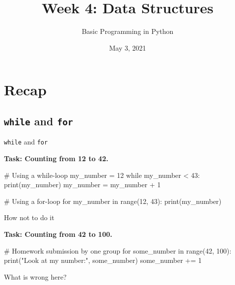 



\title[Data Structures]{Week 4: Data Structures}
\subtitle{Basic Programming in Python}


\date{May 3, 2021}

\begin{frame}[plain]
    \titlepage
\end{frame}

\begin{frame}
    \tableofcontents
\end{frame}


\section{Recap}

\subsection{\texttt{while} and \texttt{for}}

\begin{frame}[fragile]{\texttt{while} and \texttt{for}}

    \textbf{Task: Counting from 12 to 42.}

    \begin{pythoncode}
# Using a while-loop
my_number = 12
while my_number < 43:
    print(my_number)
    my_number = my_number + 1

# Using a for-loop
for my_number in range(12, 43):
    print(my_number)

    \end{pythoncode}

\end{frame}

\begin{frame}[fragile]{How not to do it}

    \textbf{Task: Counting from 42 to 100.}

    \begin{pythoncode}
# Homework submission by one group
for some_number in range(42, 100):
    print("Look at my number:", some_number)
    some_number += 1

    \end{pythoncode}

    \vspace{1em}

    What is wrong here?


\end{frame}

